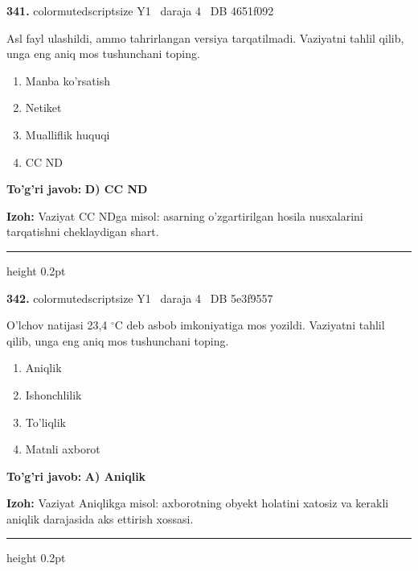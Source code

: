 \documentclass[10pt,a4paper,oneside]{article}
\begin{document}
\noindent\textbf{\color{ink}341.}  {color{muted}scriptsize Y1 \textbullet\ daraja 4 \textbullet\ DB 4651f092}
\par
Asl fayl ulashildi, ammo tahrirlangan versiya tarqatilmadi. Vaziyatni tahlil qilib, unga eng aniq mos tushunchani toping.
\begin{enumerate}[label=\Alph*),leftmargin=9mm]
\item Manba ko'rsatish
\item Netiket
\item Mualliflik huquqi
\item CC ND
\end{enumerate}
\begin{tcolorbox}[enhanced,breakable,colback=teal!4,colframe=teal!50!black,boxrule=0.5pt,arc=1.1mm,left=3mm,right=3mm,top=1.7mm,bottom=1.7mm,before skip=2mm,after skip=2mm]
\textbf{\color{teal}To'g'ri javob:} \textbf{D) CC ND}
\par\smallskip
\textbf{Izoh:} Vaziyat CC NDga misol: asarning o'zgartirilgan hosila nusxalarini tarqatishni cheklaydigan shart.
\end{tcolorbox}
\vspace{2mm}\hrule height 0.2pt \vspace{3mm}

\noindent\textbf{\color{ink}342.}  {color{muted}scriptsize Y1 \textbullet\ daraja 4 \textbullet\ DB 5e3f9557}
\par
O'lchov natijasi 23,4 \ensuremath{^\circ}C deb asbob imkoniyatiga mos yozildi. Vaziyatni tahlil qilib, unga eng aniq mos tushunchani toping.
\begin{enumerate}[label=\Alph*),leftmargin=9mm]
\item Aniqlik
\item Ishonchlilik
\item To'liqlik
\item Matnli axborot
\end{enumerate}
\begin{tcolorbox}[enhanced,breakable,colback=teal!4,colframe=teal!50!black,boxrule=0.5pt,arc=1.1mm,left=3mm,right=3mm,top=1.7mm,bottom=1.7mm,before skip=2mm,after skip=2mm]
\textbf{\color{teal}To'g'ri javob:} \textbf{A) Aniqlik}
\par\smallskip
\textbf{Izoh:} Vaziyat Aniqlikga misol: axborotning obyekt holatini xatosiz va kerakli aniqlik darajasida aks ettirish xossasi.
\end{tcolorbox}
\vspace{2mm}\hrule height 0.2pt \vspace{3mm}
\end{document}
